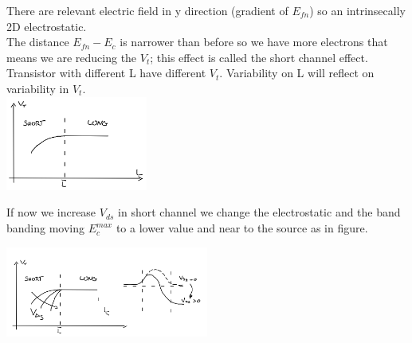 There are relevant electric field in y direction (gradient of $E_{fn}$) so an intrinsecally 2D electrostatic.\\
The distance $E_{fn}-E_c$ is narrower than before so we have more electrons that means we are reducing the $V_t$; this effect is called the short channel effect. Transistor with different L have different $V_t$. Variability on L will reflect on variability in $V_t$.\\

\centering
\includegraphics[width=0.35\textwidth]{shortcheff.png}\\
\raggedright

If now we increase $V_{ds}$ in short channel we change the electrostatic and the band banding moving $E_c^{max}$ to a lower value and near to the source as in figure.

\centering
\includegraphics[width=0.5\textwidth]{dibl.png}\\
\raggedright

